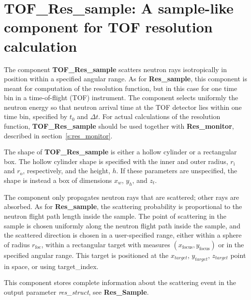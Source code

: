 
\section{TOF\_Res\_sample: A sample-like component for TOF resolution calculation}
\label{s:tof_res_sample}


The component \textbf{TOF\_Res\_sample} scatters neutron rays isotropically
in position within a specified angular range. 
As for \textbf{Res\_sample}, this component is meant
for computation of the resolution function, but in this case for one time bin in a
time-of-flight (TOF) instrument. The component selects uniformly the neutron 
energy so that neutron arrival time at the TOF detector lies within one time bin,
specified by $t_0$ and $\Delta t$.
For actual calculations of the resolution
function, \textbf{TOF\_Res\_sample} should be used
together with \textbf{Res\_monitor}, described in
section~\ref{s:res_monitor}.

The shape of \textbf{TOF\_Res\_sample} is either a hollow cylinder
or a rectangular box. 
The hollow cylinder shape is
specified with the inner and outer radius, $r_\textrm{i}$ and $r_\textrm{o}$,
respectively, and the height, $h$.
If these parameters are unspecified,
the shape is instead a box of dimensions $x_w$, $y_h$, and $z_t$.

The component only propagates neutron rays that are scattered; 
other rays are absorbed. 
As for \textbf{Res\_sample}, the scattering probability is proportional to the neutron
flight path length inside the sample.
The point of scattering in the sample is chosen uniformly
along the neutron flight path inside the sample, and the scattered
direction is chosen in a user-specified range,
either within a sphere of radius $r_\textrm{foc}$, within a rectangular
target with measures $(x_\textrm{focus}, y_\textrm{focus})$
or in the specified angular range. 
This target is positioned at the $x_{target}$, $y_{target}$, $z_{target}$ 
point in space, or using target\_index.

This component stores complete information about the scattering event in the
output parameter \textit{res\_struct}, see \textbf{Res\_Sample}. 
